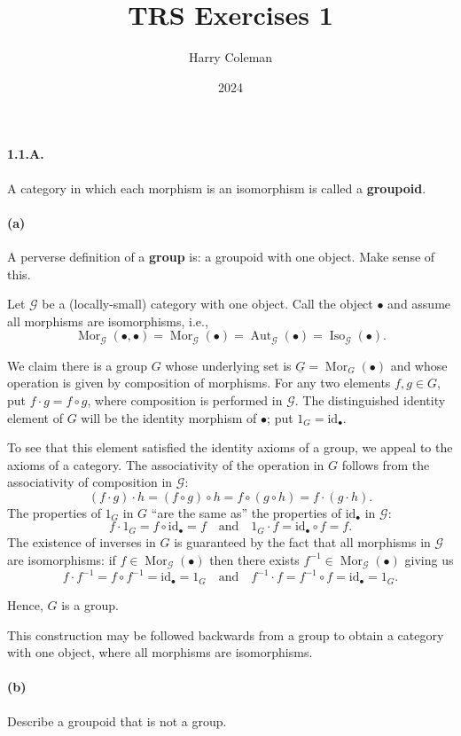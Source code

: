 \documentclass[12pt]{article}
\renewcommand{\maketitle}{\thispagestyle{title}}
\newlength{\myparskip}
\newenvironment{fullbox}{\begin{lrbox}{\savefullbox}\begin{minipage}{\dimexpr\textwidth-2\fboxsep\relax}\setlength{\parskip}{\myparskip}}{\end{minipage}\end{lrbox}\framebox[\textwidth]{\usebox{\savefullbox}}}
\newenvironment{pbox}[1][]{\begin{fullbox}\def\temp{#1}\ifx\temp\empty\else\paragraph{#1}\phantom{}\fi}{\end{fullbox}}
\theoremstyle{definition}
\newcommand{\isp}[1]{\quad\text{#1}\quad}
\newcommand{\<}{\langle}
\renewcommand{\>}{\rangle}
\newcommand{\id}{\mathrm{id}} %
\DeclareMathOperator{\Mor}{Mor}
\newcommand{\GG}{\mathcal{G}}
\newcommand{\obj}{\bullet}
\begin{document}
\title{TRS Exercises 1}
\author{Harry Coleman}
\date{2024}
\maketitle

\begin{pbox}[1.1.A.]
    A category in which each morphism is an isomorphism is called a \textbf{groupoid}.
\end{pbox}

\begin{pbox}[(a)]
    A perverse definition of a \textbf{group} is: a groupoid with one object. 
    Make sense of this.
\end{pbox}

Let $\GG$ be a (locally-small) category with one object.
Call the object $\obj$ and assume all morphisms are isomorphisms, i.e.,
\[
    \Mor_\GG(\obj, \obj) = \Mor_\GG(\obj) = \operatorname{Aut}_\GG(\obj) = \operatorname{Iso}_\GG(\obj).
\]

We claim there is a group $G$ whose underlying set is $\underline{G} = \Mor_G(\obj)$ and whose operation is given by composition of morphisms.
For any two elements $f, g \in G$, put $f \cdot g = f \circ g$, where composition is performed in $\GG$. The distinguished identity element of $G$ will be the identity morphism of $\obj$; put $1_G = \id_\obj$.

To see that this element satisfied the identity axioms of a group, we appeal to the axioms of a category.
The associativity of the operation in $G$ follows from the associativity of composition in $\GG$:
\[
    (f \cdot g) \cdot h
        = (f \circ g) \circ h
        = f \circ (g \circ h)
        = f \cdot (g \cdot h).
\]
The properties of $1_G$ in $G$ ``are the same as'' the properties of $\id_\obj$ in $\GG$:
\[
    f \cdot 1_G = f \circ \id_\obj = f
    \isp{and}
    1_G \cdot f = \id_\obj \circ f = f.
\]
The existence of inverses in $G$ is guaranteed by the fact that all morphisms in $\GG$ are isomorphisms: if $f \in \Mor_\GG(\obj)$ then there exists $f^{-1} \in \Mor_\GG(\obj)$ giving us
\[
    f \cdot f^{-1} = f \circ f^{-1} = \id_\obj = 1_G
    \isp{and}
    f^{-1} \cdot f = f^{-1} \circ f = \id_\obj = 1_G.
\]

Hence, $G$ is a group.

This construction may be followed backwards from a group to obtain a category with one object, where all morphisms are isomorphisms.

\begin{pbox}[(b)]
    Describe a groupoid that is not a group.
\end{pbox}
\end{document}
